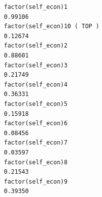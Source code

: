 \documentclass[
]{article}
\begin{document}
\begin{table}
\begin{minipage}[t]{\linewidth}
{\begin{verbatim}
factor(self_econ)1                                                                 0.99106
factor(self_econ)10 ( TOP )                                                        0.12674
factor(self_econ)2                                                                 0.88601
factor(self_econ)3                                                                 0.21749
factor(self_econ)4                                                                 0.36331
factor(self_econ)5                                                                 0.15918
factor(self_econ)6                                                                 0.08456
factor(self_econ)7                                                                 0.03597
factor(self_econ)8                                                                 0.21543
factor(self_econ)9                                                                 0.39350
                                                                                     

\end{verbatim}}
\end{minipage}
\end{table}
\end{document}
